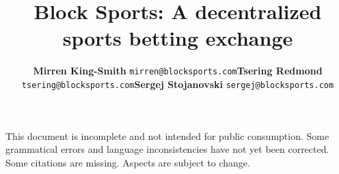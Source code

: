 \documentclass{article}
\begin{document}
\noindent
This document is incomplete and not intended for public consumption. Some grammatical errors and language inconsistencies have not yet been corrected. Some citations are missing. Aspects are subject to change.

\pagebreak

\title{{\bfseries Block Sports}: A decentralized sports betting exchange}
\renewcommand{\arraystretch}{1}
\author{
	\footnotesize
	\hspace*{+.4cm}
	\begin{tabularx}{\textwidth}{ p{3.75cm} p{3.75cm} p{3.75cm}}
		\begin{center}
		\item {\bfseries Mirren King-Smith} \texttt{mirren@blocksports.com}
	 	\end{center} &
	 	\begin{center}
		\item {\bfseries Tsering Redmond} \texttt{tsering@blocksports.com}
	 	\end{center} &
	 	\begin{center}
		\item {\bfseries Sergej Stojanovski} \texttt{sergej@blocksports.com}
	 	\end{center}
	\end{tabularx}
}

\date{}

\maketitle
\renewcommand{\arraystretch}{2}
\end{document}
